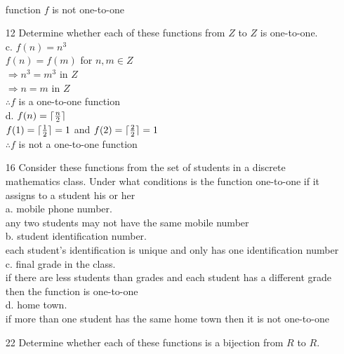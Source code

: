 \documentclass[a4paper]{article}
\newcommand\tab[1][0.5cm]{\hspace*{#1}}
\DeclarePairedDelimiter\ceil{\lceil}{\rceil}
\begin{document}
\begin{itemize}
 \\
      \tab function $f$ is not one-to-one 
    \item[12] Determine whether each of these functions from $Z$ to $Z$ is one-to-one. \\
      c. $f(n) = n^3$ \\
      \tab $f(n) = f(m)$ for $n, m \in Z$ \\
      \tab $\Rightarrow n^3 = m^3$ in $Z$ \\
      \tab $\Rightarrow n = m$ in $Z$ \\
      \tab $\therefore f$ is a one-to-one function \\
      d. $f(n) = \ceil{\frac{n}{2}}$ \\
      \tab $f(1) = \ceil{\frac{1}{2}} = 1$ and $f(2) = \ceil{\frac{2}{2}} = 1$ \\
      \tab $\therefore f$ is not a one-to-one function 
    \item[16] Consider these functions from the set of students in a discrete mathematics class. Under what conditions is the function one-to-one if it assigns to a student his or her \\ 
      a. mobile phone number. \\
      \tab any two students may not have the same mobile number \\
      b. student identification number. \\
      \tab each student's identification is unique and only has one identification number \\
      c. final grade in the class. \\
      \tab if there are less students than grades and each student has a different grade then the function is one-to-one \\
      d.  home town. \\
      \tab if more than one student has the same home town then it is not one-to-one
    \item[22] Determine whether each of these functions is a bijection from $R$ to $R$. \\

\end{itemize}
\end{document}
